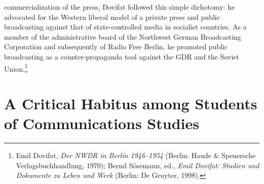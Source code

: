 \documentclass{tufte-handout}
\begin{document}
commercialization of the press, Dovifat followed this simple dichotomy:
he advocated for the Western liberal model of a private press and public
broadcasting against that of state-controlled media in socialist
countries. As a member of the administrative board of the Northwest
German Broadcasting Corporation and subsequently of Radio Free Berlin,
he promoted public broadcasting as a counter-propaganda tool against the
GDR and the Soviet Union.\footnote{Emil Dovifat, \emph{Der NWDR in
  Berlin 1946--1954} (Berlin: Haude \& Spenersche Verlagsbuchhandlung,
  1970); Bernd Sösemann, ed., \emph{Emil Dovifat: Studien und Dokumente
  zu Leben und Werk} (Berlin: De Gruyter, 1998).}

\hypertarget{a-critical-habitus-among-students-of-communications-studies}{%
\section{A Critical Habitus among Students of Communications
Studies}\label{a-critical-habitus-among-students-of-communications-studies}}
\end{document}
